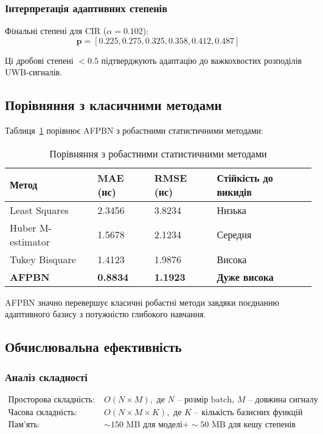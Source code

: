 \documentclass[12pt,a4paper]{article}
\begin{document}
\subsubsection{Інтерпретація адаптивних степенів}

Фінальні степені для CIR ($\alpha = 0.102$):
\begin{equation}
	\mathbf{p} = [0.225, 0.275, 0.325, 0.358, 0.412, 0.487]
\end{equation}

Ці дробові степені $< 0.5$ підтверджують адаптацію до важкохвостих розподілів UWB-сигналів.

\subsection{Порівняння з класичними методами}

Таблиця~\ref{tab:classical_comparison} порівнює AFPBN з робастними статистичними методами:

\begin{table}[htbp]
	\centering
	\caption{Порівняння з робастними статистичними методами}
	\label{tab:classical_comparison}
	\begin{tabular}{@{}llll@{}}
		\toprule
		\textbf{Метод} & \textbf{MAE (нс)} & \textbf{RMSE (нс)} & \textbf{Стійкість до викидів} \\
		\midrule
		Least Squares & 2.3456 & 3.8234 & Низька \\
		Huber M-estimator & 1.5678 & 2.1234 & Середня \\
		Tukey Bisquare & 1.4123 & 1.9876 & Висока \\
		\textbf{AFPBN} & \textbf{0.8834} & \textbf{1.1923} & \textbf{Дуже висока} \\
		\bottomrule
	\end{tabular}
\end{table}

AFPBN значно перевершує класичні робастні методи завдяки поєднанню адаптивного базису з потужністю глибокого навчання.

\subsection{Обчислювальна ефективність}

\subsubsection{Аналіз складності}

\begin{align}
	\text{Просторова складність:} \quad &O(N \times M), \text{ де } N \text{ -- розмір batch, } M \text{ -- довжина сигналу} \\
	\text{Часова складність:} \quad &O(N \times M \times K), \text{ де } K \text{ -- кількість базисних функцій} \\
	\text{Пам'ять:} \quad &\sim150 \text{ MB для моделі} + \sim50 \text{ MB для кешу степенів}
\end{align}
\end{document}
